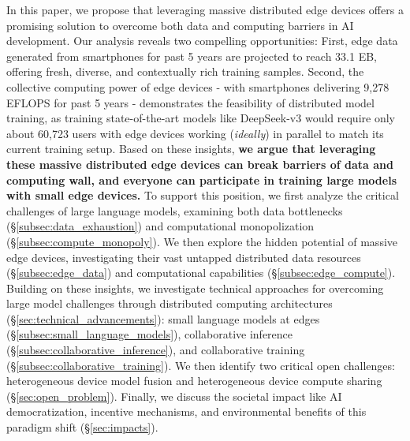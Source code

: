 In this paper, we propose that leveraging massive distributed edge devices offers a promising solution to overcome both data and computing barriers in AI development. 
Our analysis reveals two compelling opportunities: 
First, edge data generated from smartphones for past 5 years are projected to reach 33.1 EB, offering fresh, diverse, and contextually rich training samples. 
Second, the collective computing power of edge devices - with smartphones delivering 9,278 EFLOPS for past 5 years - demonstrates the feasibility of distributed model training, as training state-of-the-art models like DeepSeek-v3 would require only about 60,723 users with edge devices working (\textit{ideally}) in parallel to match its current training setup. 
Based on these insights, \textbf{we argue that leveraging these massive distributed edge devices can break barriers of data and computing wall, and everyone can participate in training large models with small edge devices.} 
To support this position, we first analyze the critical challenges of large language models, examining both data bottlenecks (\S\ref{subsec:data_exhaustion}) and computational monopolization (\S\ref{subsec:compute_monopoly}). 
We then explore the hidden potential of massive edge devices, investigating their vast untapped distributed data resources (\S\ref{subsec:edge_data}) and computational capabilities (\S\ref{subsec:edge_compute}). 
Building on these insights, we investigate technical approaches for overcoming large model challenges through distributed computing architectures (\S\ref{sec:technical_advancements}): small language models at edges (\S\ref{subsec:small_language_models}), collaborative inference (\S\ref{subsec:collaborative_inference}), and collaborative training (\S\ref{subsec:collaborative_training}).
We then identify two critical open challenges: heterogeneous device model fusion and heterogeneous device compute sharing (\S\ref{sec:open_problem}). 
Finally, we discuss the societal impact like AI democratization, incentive mechanisms, and environmental benefits of this paradigm shift (\S\ref{sec:impacts}).


